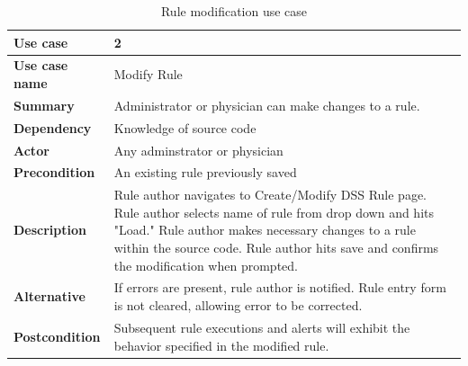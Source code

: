 \documentclass[12pt,letterpaper]{article}
\begin{document}
\begin{table}
\begin{centering}
\begin{tabular}{ |  >{\bfseries}l | p{5in} |} \hline
Use case &
2 \\ \hline
Use case name &
Modify Rule \\ \hline
Summary &
Administrator or physician can make changes to a rule. \\ \hline
Dependency &
Knowledge of source code \\ \hline
Actor &
Any adminstrator or physician \\ \hline
Precondition &
An existing rule previously saved \\ \hline
Description &
Rule author navigates to Create/Modify DSS Rule page. \newline
Rule author selects name of rule from drop down and hits "Load." \newline
Rule author makes necessary changes to a rule within the source code. \newline
Rule author hits save and confirms the modification when prompted.
\\ \hline
Alternative      & 
If errors are present, rule author is notified. Rule entry form is 
not cleared, allowing error to be corrected. \\ \hline
Postcondition &
Subsequent rule executions and alerts will exhibit the behavior specified in 
the modified rule.
 \\ \hline
\end{tabular}
\end{centering}
\caption{Rule modification use case} \label{tab:MODIFY_RULE_USE_CASE}
\end{table}
\end{document}
